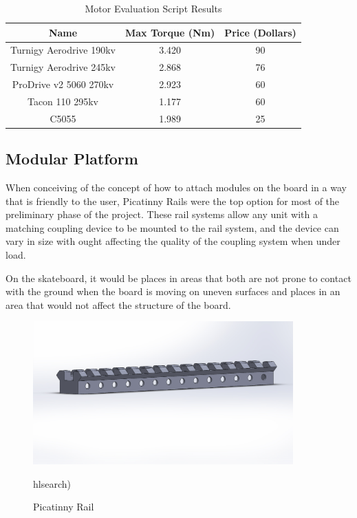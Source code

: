 \documentclass[titlepage, letterpaper,12pt]{article}
\begin{document}
\begin{table}[]
    \centering
    \begin{tabular}{ |c | c | c| }
        \hline
        \textbf{Name} & \textbf{Max Torque (Nm)} & \textbf{Price (Dollars)} \\
        \hline \hline
        Turnigy Aerodrive 190kv & 3.420 & 90  \\
         \hline
        Turnigy Aerodrive 245kv & 2.868 & 76  \\
         \hline
        ProDrive v2 5060 270kv & 2.923 & 60  \\
        \hline
        Tacon 110 295kv & 1.177 & 60  \\
         \hline
        C5055 & 1.989  & 25  \\
        \hline
    \end{tabular}
    \caption{Motor Evaluation Script Results}
    \label{MotorTable}
\end{table}

\subsection{Modular Platform}
When conceiving of the concept of how to attach modules on the board in a way that is friendly to the user, Picatinny Rails were the top option for most of the preliminary phase of the project. These rail systems allow any unit with a matching coupling device to be mounted to the rail system, and the device can vary in size with ought affecting the quality of the coupling system when under load.

On the skateboard, it would be places in areas that both are not prone to contact with the ground when the board is moving on uneven surfaces and places in an area that would not affect the structure of the board.

\begin{figure}[h]
    \centering
    \includegraphics[width=10cm]{figs/Picatinny_Rail.JPG}
    \caption{Picatinny Rail}
    \label{fig:picTiny0}
    hlsearch)
\end{figure}
\end{document}
